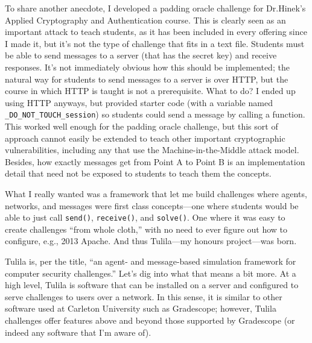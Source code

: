 \documentclass[12pt]{article}
\begin{document}

To share another anecdote, I developed a padding oracle challenge for Dr.\@ Hinek's Applied Cryptography and Authentication course. This is clearly seen as an important attack to teach students, as it has been included in every offering since I made it, but it's not the type of challenge that fits in a text file. Students must be able to send messages to a server (that has the secret key) and receive responses. It's not immediately obvious how this should be implemented; the natural way for students to send messages to a server is over HTTP, but the course in which HTTP is taught is not a prerequisite. What to do? I ended up using HTTP anyways, but provided starter code (with a variable named \texttt{\_DO\_NOT\_TOUCH\_session}) so students could send a message by calling a function. This worked well enough for the padding oracle challenge, but this sort of approach cannot easily be extended to teach other important cryptographic vulnerabilities, including any that use the Machine-in-the-Middle attack model. Besides, how exactly messages get from Point A to Point B is an implementation detail that need not be exposed to students to teach them the concepts.


What I really wanted was a framework that let me build challenges where agents, networks, and messages were first class concepts---one where students would be able to just call \texttt{send()}, \texttt{receive()}, and \texttt{solve()}. One where it was easy to create challenges ``from whole cloth,'' with no need to ever figure out how to configure, e.g., 2013 Apache. And thus Tulila---my honours project---was born.

Tulila is, per the title, ``an agent- and message-based simulation framework for computer security challenges.'' Let's dig into what that means a bit more. At a high level, Tulila is software that can be installed on a server and configured to serve challenges to users over a network. In this sense, it is similar to other software used at Carleton University such as Gradescope; however, Tulila challenges offer features above and beyond those supported by Gradescope (or indeed any software that I'm aware of).
\end{document}
